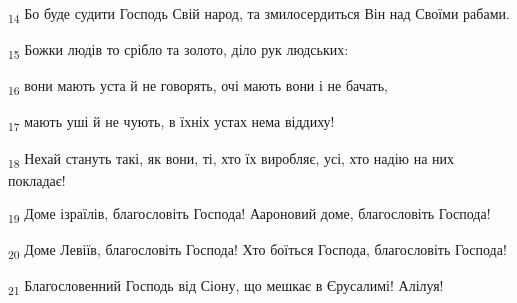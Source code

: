 \begin{tcolorbox}
\textsubscript{14} Бо буде судити Господь Свій народ, та змилосердиться Він над Своїми рабами.
\end{tcolorbox}
\begin{tcolorbox}
\textsubscript{15} Божки людів то срібло та золото, діло рук людських:
\end{tcolorbox}
\begin{tcolorbox}
\textsubscript{16} вони мають уста й не говорять, очі мають вони і не бачать,
\end{tcolorbox}
\begin{tcolorbox}
\textsubscript{17} мають уші й не чують, в їхніх устах нема віддиху!
\end{tcolorbox}
\begin{tcolorbox}
\textsubscript{18} Нехай стануть такі, як вони, ті, хто їх виробляє, усі, хто надію на них покладає!
\end{tcolorbox}
\begin{tcolorbox}
\textsubscript{19} Доме ізраїлів, благословіть Господа! Аароновий доме, благословіть Господа!
\end{tcolorbox}
\begin{tcolorbox}
\textsubscript{20} Доме Левіїв, благословіть Господа! Хто боїться Господа, благословіть Господа!
\end{tcolorbox}
\begin{tcolorbox}
\textsubscript{21} Благословенний Господь від Сіону, що мешкає в Єрусалимі! Алілуя!
\end{tcolorbox}
